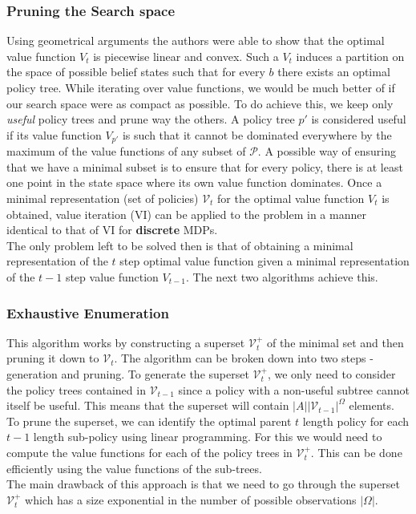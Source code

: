 \documentclass{article}
\begin{document}
\subsubsection*{Pruning the Search space}
Using geometrical arguments the authors were able to show that the optimal value function $V_t$ is piecewise linear and convex. Such a $V_t$ induces a partition on the space of possible belief states such that for every $b$ there exists an optimal policy tree. While iterating over value functions, we would be much better of if our search space were as compact as possible. To do achieve this, we keep only \textit{useful} policy trees and prune way the others. A policy tree $p'$ is considered useful if its value function $V_{p'}$ is such that  it cannot be dominated everywhere by the maximum of the value functions of any subset of $\mathcal{P}$. A possible way of ensuring that we have a minimal subset is to ensure that for every policy, there is at least one point in the state space where its own value function dominates. Once a minimal representation (set of policies) $\mathcal{V}_t$ for the optimal value function $V_t$ is obtained, value iteration (VI) can be applied to the problem in a manner identical to that of VI for \textbf{discrete} MDPs.\\
The only problem left to be solved then is that of obtaining a minimal representation of the $t$ step optimal value function given a minimal representation of the $t-1$ step value function $V_{t-1}$. The next two algorithms achieve this.
\subsubsection*{Exhaustive Enumeration}
This algorithm works by constructing a superset $\mathcal{V}_t^{+}$ of the minimal set and then pruning it down to $\mathcal{V}_t$. The algorithm can be broken down into two steps - generation and pruning. To generate the superset $\mathcal{V}_t^{+}$, we only need to consider the policy trees contained in $\mathcal{V}_{t-1}$ since a policy with a non-useful subtree cannot itself be useful. This means that the superset will contain $|A||\mathcal{V}_{t-1}|^{\Omega}$ elements.\\
To prune the superset, we can identify the optimal parent $t$ length policy for each $t-1$ length sub-policy using linear programming. For this we would need to compute the value functions for each of the policy trees in $\mathcal{V}_t^{+}$. This can be done efficiently using the value functions of the sub-trees.\\
The main drawback of this approach is that we need to go through the superset $\mathcal{V}_t^{+}$ which has a size exponential in the number of possible observations $|\Omega|$.
\end{document}

